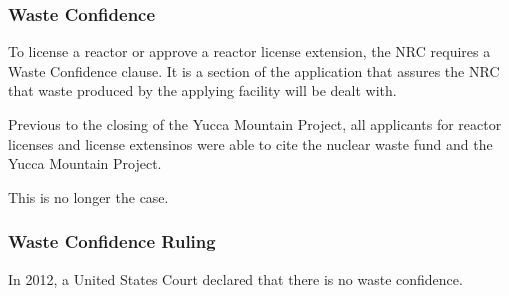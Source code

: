 
\begin{frame}[ctb!]
    \frametitle{Waste Confidence}
    To license a reactor or approve a reactor license extension, the NRC 
    requires a Waste Confidence clause. It is a section of the application that 
    assures the NRC that waste produced by the applying facility will be dealt 
    with. 

    Previous to the closing of the Yucca Mountain Project, all applicants for 
    reactor licenses and license extensinos were able to cite the nuclear waste 
    fund and the Yucca Mountain Project. 

    This is no longer the case. 
  \end{frame}

\begin{frame}[ctb!]
    \frametitle{Waste Confidence Ruling}
    In 2012, a United States Court declared that there is no waste confidence. 
    
  \end{frame}

